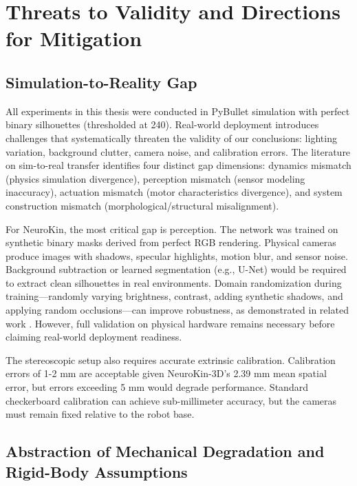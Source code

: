 \documentclass[12pt,a4paper,oneside]{report}
\begin{document}
\section{Threats to Validity and Directions for Mitigation}

\subsection{Simulation-to-Reality Gap}
\label{subsec:simulation_to_reality_gap}

All experiments in this thesis were conducted in PyBullet simulation with perfect binary silhouettes (thresholded at 240). Real-world deployment introduces challenges that systematically threaten the validity of our conclusions: lighting variation, background clutter, camera noise, and calibration errors. The literature on sim-to-real transfer \cite{tan2018simtoreal, aljalbout2026realitygap} identifies four distinct gap dimensions: dynamics mismatch (physics simulation divergence), perception mismatch (sensor modeling inaccuracy), actuation mismatch (motor characteristics divergence), and system construction mismatch (morphological/structural misalignment).

For NeuroKin, the most critical gap is perception. The network was trained on synthetic binary masks derived from perfect RGB rendering. Physical cameras produce images with shadows, specular highlights, motion blur, and sensor noise. Background subtraction or learned segmentation (e.g., U-Net) would be required to extract clean silhouettes in real environments. Domain randomization during training—randomly varying brightness, contrast, adding synthetic shadows, and applying random occlusions—can improve robustness, as demonstrated in related work \cite{rezvani2024robust, qiu2024swim2real}. However, full validation on physical hardware remains necessary before claiming real-world deployment readiness.

The stereoscopic setup also requires accurate extrinsic calibration. Calibration errors of 1-2 mm are acceptable given NeuroKin-3D's 2.39 mm mean spatial error, but errors exceeding 5 mm would degrade performance. Standard checkerboard calibration can achieve sub-millimeter accuracy, but the cameras must remain fixed relative to the robot base.

\subsection{Abstraction of Mechanical Degradation and Rigid-Body Assumptions}
\label{subsec:abstraction_of_mechanical_degradation_and_rigid_body_assumptions}
\end{document}
